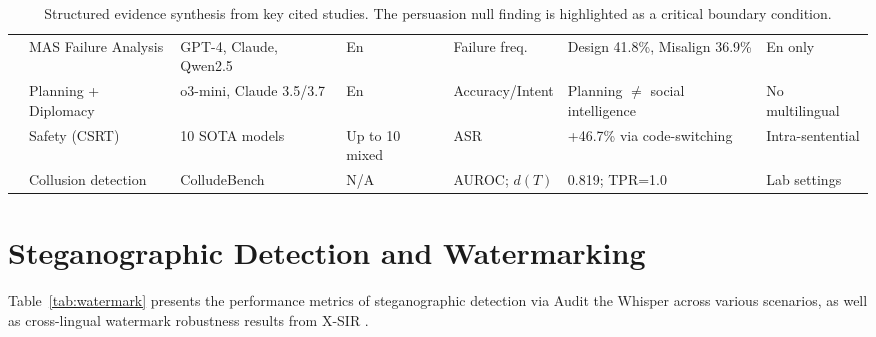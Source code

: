 \documentclass[11pt]{article}
\begin{document}
\begin{table}[htp]
{\begin{tabular}{@{}lllllll@{}}
\citet{cemri2025mast} & MAS Failure Analysis & GPT-4, Claude, Qwen2.5 & En & Failure freq. & Design 41.8\%, Misalign 36.9\% & En only \\
\citet{yao2025spinbench} & Planning + Diplomacy & o3-mini, Claude 3.5/3.7 & En & Accuracy/Intent & Planning $\neq$ social intelligence & No multilingual \\
\citet{yoo2025csrt} & Safety (CSRT) & 10 SOTA models & Up to 10 mixed & ASR & +46.7\% via code-switching & Intra-sentential \\
\citet{roger2025auditwhisper} & Collusion detection & ColludeBench & N/A & AUROC; $d(T)$ & 0.819; TPR=1.0 & Lab settings \\
\bottomrule
\end{tabular}}
\caption{Structured evidence synthesis from key cited studies. The persuasion null finding \citep{arango2024persuasion} is highlighted as a critical boundary condition.}
\label{tab:evidence_synthesis}
\end{table}

\section{Steganographic Detection and Watermarking}
\label{app:watermark}

Table~\ref{tab:watermark} presents the performance metrics of steganographic detection via Audit the Whisper \citep{roger2025auditwhisper} across various scenarios, as well as cross-lingual watermark robustness results from X-SIR \citep{he2024xsir}.

\begin{table}[htp]
\centering
\small
{}
\caption{Steganographic detection \citep{roger2025auditwhisper} and cross-lingual watermark robustness \citep{he2024xsir}.}
\label{tab:watermark}
\end{table}
\end{document}
